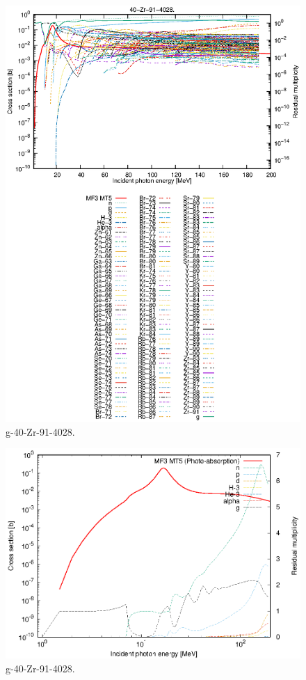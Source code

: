 \begin{figure}
 \includegraphics[width=\linewidth]{eps/g_40-Zr-91_4028.eps}
  \caption{g-40-Zr-91-4028.}
\end{figure}
\newpage \clearpage

\begin{figure}
 \includegraphics[width=\linewidth]{eps-log/g_40-Zr-91_4028.eps}
 \caption{g-40-Zr-91-4028.}
\end{figure}
\newpage \clearpage

